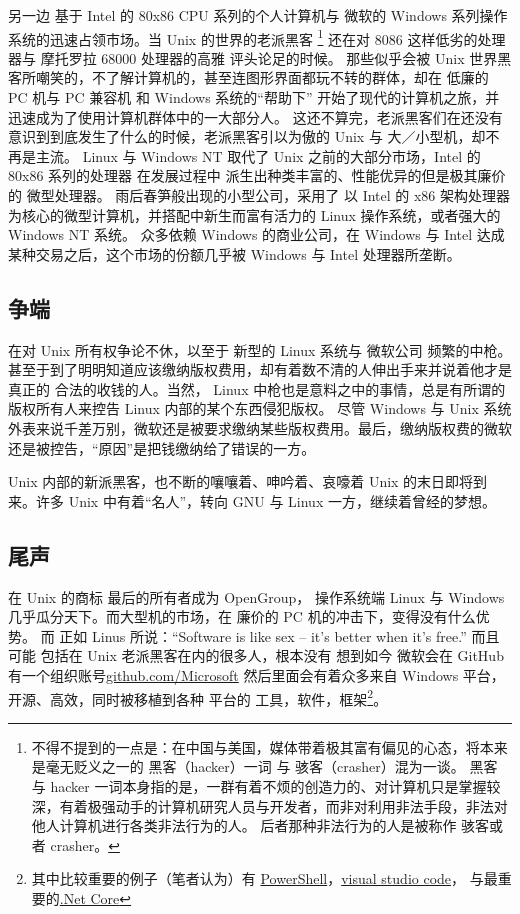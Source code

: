     另一边 基于 Intel 的 80x86 CPU 系列的个人计算机与 微软的 Windows 系列操作系统的迅速占领市场。当 Unix 的世界的老派黑客
    \footnote{不得不提到的一点是：在中国与美国，媒体带着极其富有偏见的心态，将本来是毫无贬义之一的 黑客（hacker）一词 与  骇客（crasher）混为一谈。
    黑客 与 hacker 一词本身指的是，一群有着不烦的创造力的、对计算机只是掌握较深，有着极强动手的计算机研究人员与开发者，而非对利用非法手段，非法对他人计算机进行各类非法行为的人。
    后者那种非法行为的人是被称作 骇客或者 crasher。}
    还在对 8086 这样低劣的处理器与 摩托罗拉 68000 处理器的高雅 评头论足的时候。
    那些似乎会被 Unix 世界黑客所嘲笑的，不了解计算机的，甚至连图形界面都玩不转的群体，却在 低廉的 PC 机与 PC 兼容机 和 Windows 系统的“帮助下”
    开始了现代的计算机之旅，并迅速成为了使用计算机群体中的一大部分人。
    这还不算完，老派黑客们在还没有意识到到底发生了什么的时候，老派黑客引以为傲的 Unix 与 大／小型机，却不再是主流。
    Linux 与 Windows NT 取代了 Unix 之前的大部分市场，Intel 的 80x86 系列的处理器 在发展过程中 派生出种类丰富的、性能优异的但是极其廉价的 微型处理器。
    雨后春笋般出现的小型公司，采用了 以 Intel 的 x86 架构处理器为核心的微型计算机，并搭配中新生而富有活力的 Linux 操作系统，或者强大的 Windows NT 系统。
    众多依赖 Windows 的商业公司，在 Windows 与 Intel 达成某种交易之后，这个市场的份额几乎被 Windows 与 Intel 处理器所垄断。

    \subsection{争端}
    在对 Unix 所有权争论不休，以至于 新型的 Linux 系统与 微软公司 频繁的中枪。甚至于到了明明知道应该缴纳版权费用，却有着数不清的人伸出手来并说着他才是真正的
    合法的收钱的人。当然， Linux 中枪也是意料之中的事情，总是有所谓的 版权所有人来控告 Linux 内部的某个东西侵犯版权。
    尽管 Windows 与 Unix 系统外表来说千差万别，微软还是被要求缴纳某些版权费用。最后，缴纳版权费的微软还是被控告，“原因”是把钱缴纳给了错误的一方。

    Unix 内部的新派黑客，也不断的嚷嚷着、呻吟着、哀嚎着 Unix 的末日即将到来。许多 Unix 中有着“名人”，转向 GNU 与 Linux 一方，继续着曾经的梦想。
    
    \subsection{尾声}
    在 Unix 的商标 最后的所有者成为 OpenGroup， 操作系统端 Linux 与 Windows 几乎瓜分天下。而大型机的市场，在 廉价的 PC 机的冲击下，变得没有什么优势。
    而 正如 Linus 所说：“Software is like sex -- it's better when it's free.” 而且可能 包括在 Unix 老派黑客在内的很多人，根本没有
    想到如今 微软会在 GitHub 有一个组织账号\href{https://github.com/microsoft}{github.com/Microsoft} 然后里面会有着众多来自 Windows
    平台，开源、高效，同时被移植到各种 平台的 工具，软件，框架\footnote{其中比较重要的例子（笔者认为）有
      \href{https://github.com/microsoft/powershell}{PowerShell}，\href{https://github.com/microsoft/vscode}{visual studio code}，
      与最重要的\href{https://github.com/microsoft/??}{.Net Core}}。
    
